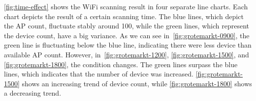 	\autoref{fig:time-effect} shows the WiFi scanning result in four separate line charts. Each chart depicts the result of a certain scanning time. The blue lines, which depict the \ac{AP} count, fluctuate stably around 100, while the green lines, which represent the device count, have a big variance. As we can see in~\autoref{fig:grotemarkt-0900}, the green line is fluctuating below the blue line, indicating there were less device than available \ac{AP} count. However, in~\autoref{fig:grotemarkt-1200}, \autoref{fig:grotemarkt-1500}, and \autoref{fig:grotemarkt-1800}, the condition changes. The green lines surpass the blue lines, which indicates that the number of device was increased. \autoref{fig:grotemarkt-1500} shows an increasing trend of device count, while \autoref{fig:grotemarkt-1800} shows a decreasing trend.

